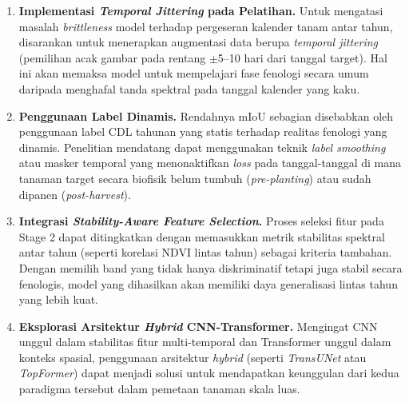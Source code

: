\begin{enumerate}

    \item \textbf{Implementasi \textit{Temporal Jittering} pada Pelatihan.}
    Untuk mengatasi masalah \textit{brittleness} model terhadap pergeseran kalender tanam antar tahun, disarankan untuk menerapkan augmentasi data berupa \textit{temporal jittering} (pemilihan acak gambar pada rentang $\pm$5--10 hari dari tanggal target). Hal ini akan memaksa model untuk mempelajari fase fenologi secara umum daripada menghafal tanda spektral pada tanggal kalender yang kaku.

    \item \textbf{Penggunaan Label Dinamis.}
    Rendahnya mIoU sebagian disebabkan oleh penggunaan label CDL tahunan yang statis terhadap realitas fenologi yang dinamis. Penelitian mendatang dapat menggunakan teknik \textit{label smoothing} atau masker temporal yang menonaktifkan \textit{loss} pada tanggal-tanggal di mana tanaman target secara biofisik belum tumbuh (\textit{pre-planting}) atau sudah dipanen (\textit{post-harvest}).

    \item \textbf{Integrasi \textit{Stability-Aware Feature Selection}.}
    Proses seleksi fitur pada Stage 2 dapat ditingkatkan dengan memasukkan metrik stabilitas spektral antar tahun (seperti korelasi NDVI lintas tahun) sebagai kriteria tambahan. Dengan memilih band yang tidak hanya diskriminatif tetapi juga stabil secara fenologis, model yang dihasilkan akan memiliki daya generalisasi lintas tahun yang lebih kuat.

    \item \textbf{Eksplorasi Arsitektur \textit{Hybrid} CNN-Transformer.}
    Mengingat CNN unggul dalam stabilitas fitur multi-temporal dan Transformer unggul dalam konteks spasial, penggunaan arsitektur \textit{hybrid} (seperti \textit{TransUNet} atau \textit{TopFormer}) dapat menjadi solusi untuk mendapatkan keunggulan dari kedua paradigma tersebut dalam pemetaan tanaman skala luas.

\end{enumerate}
